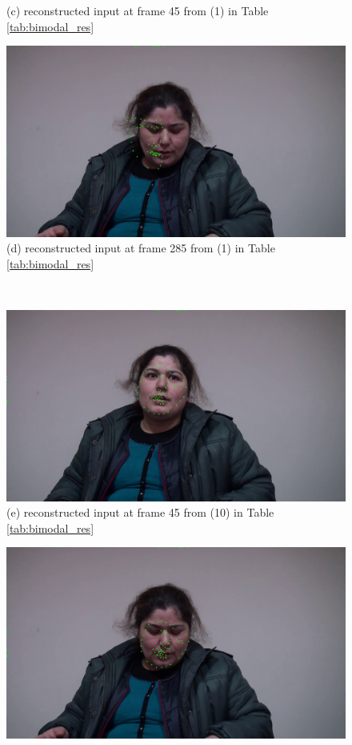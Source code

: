 \begin{figure}[htb]
\begin{minipage}[c]{0.42\linewidth}
    (c) reconstructed input at frame 45 from (1) in Table \ref{tab:bimodal_res}
    \end{minipage}
    \begin{minipage}[c]{0.42\linewidth}
    \centering
    \includegraphics[width=\textwidth]{images/facial/recons_285_face_0_biDDAE_mfcc.png} \\
    (d) reconstructed input at frame 285 from (1) in Table \ref{tab:bimodal_res}
    \end{minipage}
    \\
    \begin{minipage}[c]{0.42\linewidth}
    \centering
    \includegraphics[width=\textwidth]{images/facial/recons_45_face_0_biDDAE_egemaps.png} \\
    (e) reconstructed input at frame 45 from (10) in Table \ref{tab:bimodal_res}
    \end{minipage}
    \begin{minipage}[c]{0.42\linewidth}
    \centering
    \includegraphics[width=\textwidth]{images/facial/recons_285_face_0_biDDAE_egemaps.png} \\

\end{minipage}
\end{figure}
